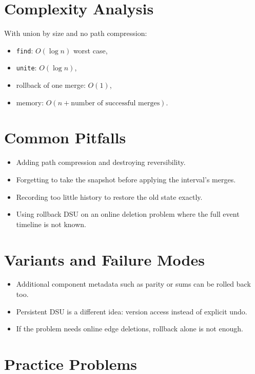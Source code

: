 \section*{Complexity Analysis}

With union by size and no path compression:

\begin{itemize}
  \item \texttt{find}: \(O(\log n)\) worst case,
  \item \texttt{unite}: \(O(\log n)\),
  \item rollback of one merge: \(O(1)\),
  \item memory: \(O(n + \text{number of successful merges})\).
\end{itemize}

\section*{Common Pitfalls}

\begin{itemize}
  \item Adding path compression and destroying reversibility.
  \item Forgetting to take the snapshot before applying the interval's merges.
  \item Recording too little history to restore the old state exactly.
  \item Using rollback DSU on an online deletion problem where the full event timeline is not known.
\end{itemize}

\section*{Variants and Failure Modes}

\begin{itemize}
  \item Additional component metadata such as parity or sums can be rolled back too.
  \item Persistent DSU is a different idea: version access instead of explicit undo.
  \item If the problem needs online edge deletions, rollback alone is not enough.
\end{itemize}

\section*{Practice Problems}

